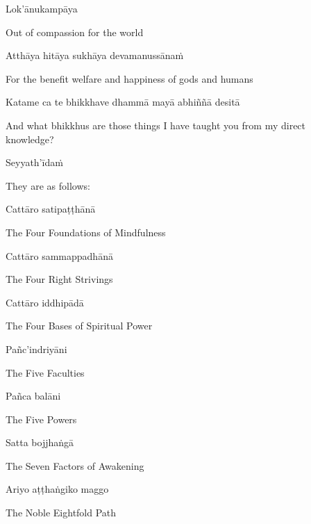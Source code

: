 Lok'ānukampāya

\begin{english}
  Out of compassion for the world
\end{english}

Atthāya hitāya sukhāya devamanussānaṁ

\begin{english}
  For the benefit welfare and happiness of gods and humans
\end{english}

Katame ca te bhikkhave dhammā mayā abhiññā desitā

\begin{english-hang}
  And what bhikkhus are those things I have taught you from my direct knowledge?
\end{english-hang}

Seyyath'īdaṁ

\begin{english}
  They are as follows:
\end{english}

Cattāro satipaṭṭhānā

\begin{english}
  The Four Foundations of Mindfulness
\end{english}

Cattāro sammappadhānā

\begin{english}
  The Four Right Strivings
\end{english}

Cattāro iddhipādā

\begin{english}
  The Four Bases of Spiritual Power
\end{english}

Pañc'indriyāni

\begin{english}
  The Five Faculties
\end{english}

Pañca balāni

\begin{english}
  The Five Powers
\end{english}

Satta bojjhaṅgā

\begin{english}
  The Seven Factors of Awakening
\end{english}

Ariyo aṭṭhaṅgiko maggo

\begin{english}
  The Noble Eightfold Path
\end{english}

